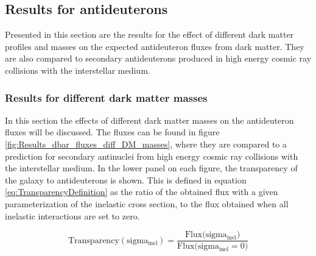 \subsection{Results for antideuterons}
Presented in this section are the results for the effect of different dark matter profiles and masses on the expected antideuteron fluxes from dark matter. They are also compared to secondary antideuterons produced in high energy cosmic ray collisions with the interstellar medium. 

\subsubsection{Results for different dark matter masses}
In this section the effects of different dark matter masses on the antideuteron fluxes will be discussed. The fluxes can be found in figure \ref{fig:Results_dbar_fluxes_diff_DM_masses}, where they are compared to a prediction for secondary antinuclei from high energy cosmic ray collisions with the interstellar medium. In the lower panel on each figure, the transparency of the galaxy to antideuterons is shown. This is defined in equation \ref{eq:TransparencyDefinition} as the ratio of the obtained flux with a given parameterization of the inelastic cross section, to the flux obtained when all inelastic interactions are set to zero.

\begin{equation}\label{eq:TransparencyDefinition}
    \mathrm{Transparency(sigma_{inel})} = \frac{\mathrm{Flux(sigma_{inel}})}{\mathrm{Flux(sigma_{inel}=0})} 
\end{equation}

